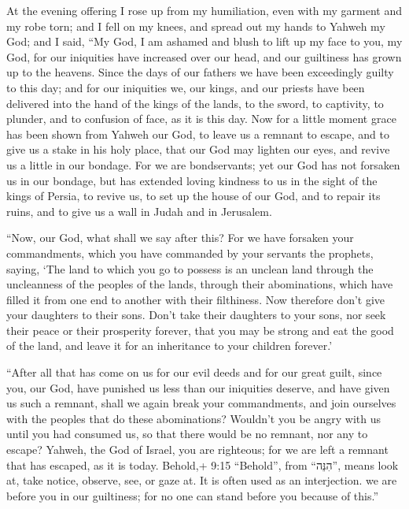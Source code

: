  At the evening offering I rose up from my humiliation, even
with my garment and my robe torn; and I fell on my knees, and spread out
my hands to Yahweh my God;  and I said, ``My God, I am
ashamed and blush to lift up my face to you, my God, for our iniquities
have increased over our head, and our guiltiness has grown up to the
heavens.  Since the days of our fathers we have been
exceedingly guilty to this day; and for our iniquities we, our kings,
and our priests have been delivered into the hand of the kings of the
lands, to the sword, to captivity, to plunder, and to confusion of face,
as it is this day.  Now for a little moment grace has been
shown from Yahweh our God, to leave us a remnant to escape, and to give
us a stake in his holy place, that our God may lighten our eyes, and
revive us a little in our bondage.  For we are bondservants;
yet our God has not forsaken us in our bondage, but has extended loving
kindness to us in the sight of the kings of Persia, to revive us, to set
up the house of our God, and to repair its ruins, and to give us a wall
in Judah and in Jerusalem.

 ``Now, our God, what shall we say after this? For we have
forsaken your commandments,  which you have commanded by
your servants the prophets, saying, `The land to which you go to possess
is an unclean land through the uncleanness of the peoples of the lands,
through their abominations, which have filled it from one end to another
with their filthiness.  Now therefore don't give your
daughters to their sons. Don't take their daughters to your sons, nor
seek their peace or their prosperity forever, that you may be strong and
eat the good of the land, and leave it for an inheritance to your
children forever.'

 ``After all that has come on us for our evil deeds and for
our great guilt, since you, our God, have punished us less than our
iniquities deserve, and have given us such a remnant, 
shall we again break your commandments, and join ourselves with the
peoples that do these abominations? Wouldn't you be angry with us until
you had consumed us, so that there would be no remnant, nor any to
escape?  Yahweh, the God of Israel, you are righteous; for
we are left a remnant that has escaped, as it is today. Behold,+ 9:15
``Behold'', from ``הִנֵּה'', means look at, take notice, observe, see,
or gaze at. It is often used as an interjection. we are before you in
our guiltiness; for no one can stand before you because of this.''

